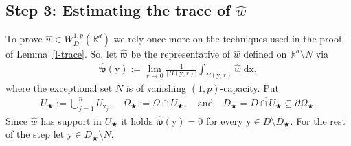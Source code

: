 \documentclass[10pt,leqno]{amsart}
\theoremstyle{definition}
\numberwithin{equation}{section}
\begin{document}
\subsection*{Step 3: Estimating the trace of $\widehat{w}$} 

To prove $\widehat{w} \in W_D^{1,p}({{\mathbb R}}^d)$ we rely once more on the techniques
used in the proof of Lemma~\ref{l-trace}. So, let $\widehat{{\mathfrak w}}$ be the
representative of $\widehat{w}$ defined on ${{\mathbb R}}^d \setminus N$ via
\begin{align*}
 \widehat{{\mathfrak w}}({{\mathrm y}}):= \lim_{r \to 0} \frac{1}{|B({{\mathrm y}},r)|} \int_{B({{\mathrm y}}, r)}
\widehat{w} \; {{\mathrm d}} {{\mathrm x}},
\end{align*}
where the exceptional set $N$ is of vanishing $(1,p)$-capacity. Put
\begin{align*}
 U_\bigstar:= \bigcup_{j=1}^n U_{{{\mathrm x}}_j}, \quad \Omega_\bigstar := \Omega \cap
U_\bigstar, \quad \text{and} \quad D_\bigstar = \overline{D \cap U_\bigstar}
\subseteq \partial \Omega_\bigstar.
\end{align*}
Since $\widehat{w}$ has support in $U_\bigstar$ it holds $\widehat{{\mathfrak w}}({{\mathrm y}}) = 0$
for every ${{\mathrm y}} \in D \setminus D_\bigstar$. For the rest of the step let ${{\mathrm y}} \in
D_\bigstar \setminus N$. 
\end{document}
